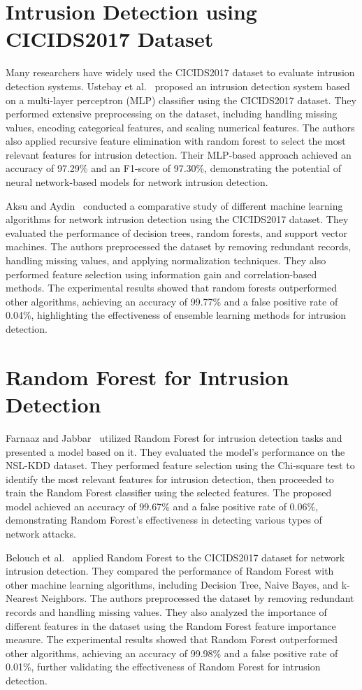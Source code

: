 \section{Intrusion Detection using CICIDS2017 Dataset}
Many researchers have widely used the CICIDS2017 dataset to evaluate intrusion detection systems. Ustebay et al.~\cite{ustebay2018intrusion} proposed an intrusion detection system based on a multi-layer perceptron (MLP) classifier using the CICIDS2017 dataset. They performed extensive preprocessing on the dataset, including handling missing values, encoding categorical features, and scaling numerical features. The authors also applied recursive feature elimination with random forest to select the most relevant features for intrusion detection. Their MLP-based approach achieved an accuracy of 97.29\% and an F1-score of 97.30\%, demonstrating the potential of neural network-based models for network intrusion detection.

Aksu and Aydin~\cite{aksu2018detecting} conducted a comparative study of different machine learning algorithms for network intrusion detection using the CICIDS2017 dataset. They evaluated the performance of decision trees, random forests, and support vector machines. The authors preprocessed the dataset by removing redundant records, handling missing values, and applying normalization techniques. They also performed feature selection using information gain and correlation-based methods. The experimental results showed that random forests outperformed other algorithms, achieving an accuracy of 99.77\% and a false positive rate of 0.04\%, highlighting the effectiveness of ensemble learning methods for intrusion detection.

\section{Random Forest for Intrusion Detection}
Farnaaz and Jabbar~\cite{farnaaz2016random} utilized Random Forest for intrusion detection tasks and presented a model based on it. They evaluated the model's performance on the NSL-KDD dataset. They performed feature selection using the Chi-square test to identify the most relevant features for intrusion detection, then proceeded to train the Random Forest classifier using the selected features. The proposed model achieved an accuracy of 99.67\% and a false positive rate of 0.06\%, demonstrating Random Forest's effectiveness in detecting various types of network attacks.

Belouch et al.~\cite{belouch2018performance} applied Random Forest to the CICIDS2017 dataset for network intrusion detection. They compared the performance of Random Forest with other machine learning algorithms, including Decision Tree, Naive Bayes, and k-Nearest Neighbors. The authors preprocessed the dataset by removing redundant records and handling missing values. They also analyzed the importance of different features in the dataset using the Random Forest feature importance measure. The experimental results showed that Random Forest outperformed other algorithms, achieving an accuracy of 99.98\% and a false positive rate of 0.01\%, further validating the effectiveness of Random Forest for intrusion detection.

